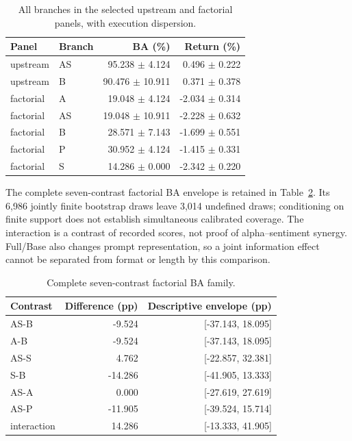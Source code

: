 \begin{table}[htbp]\centering\small{}\setlength{\tabcolsep}{4pt}
\caption[Selected upstream and factorial panels]{All branches in the selected upstream and factorial panels, with execution dispersion.}\label{tab:smallpanels}
\begin{tabular}{@{}l l rr@{}}\toprule
Panel & Branch & BA (\%) & Return (\%)\\\midrule
upstream & AS & 95.238 \ensuremath{\pm} 4.124 & 0.496 \ensuremath{\pm} 0.222\\
upstream & B & 90.476 \ensuremath{\pm} 10.911 & 0.371 \ensuremath{\pm} 0.378\\
factorial & A & 19.048 \ensuremath{\pm} 4.124 & -2.034 \ensuremath{\pm} 0.314\\
factorial & AS & 19.048 \ensuremath{\pm} 10.911 & -2.228 \ensuremath{\pm} 0.632\\
factorial & B & 28.571 \ensuremath{\pm} 7.143 & -1.699 \ensuremath{\pm} 0.551\\
factorial & P & 30.952 \ensuremath{\pm} 4.124 & -1.415 \ensuremath{\pm} 0.331\\
factorial & S & 14.286 \ensuremath{\pm} 0.000 & -2.342 \ensuremath{\pm} 0.220\\
\bottomrule\end{tabular}\end{table}

The complete seven-contrast factorial BA envelope is retained in
Table~\ref{tab:factorial}. Its 6,986 jointly finite bootstrap draws leave
3,014 undefined draws; conditioning on finite support does not establish
simultaneous calibrated coverage. The interaction is a contrast of
recorded scores, not proof of alpha--sentiment synergy. Full/Base also
changes prompt representation, so a joint information effect cannot be
separated from format or length by this comparison.

\begin{table}[htbp]\centering\small{}\setlength{\tabcolsep}{4pt}
\caption[Complete factorial BA family]{Complete seven-contrast factorial BA family.}\label{tab:factorial}
\begin{tabular}{@{}l rr@{}}\toprule
Contrast & Difference (pp) & Descriptive envelope (pp)\\\midrule
AS-B & -9.524 & {[}-37.143, 18.095{]}\\
A-B & -9.524 & {[}-37.143, 18.095{]}\\
AS-S & 4.762 & {[}-22.857, 32.381{]}\\
S-B & -14.286 & {[}-41.905, 13.333{]}\\
AS-A & 0.000 & {[}-27.619, 27.619{]}\\
AS-P & -11.905 & {[}-39.524, 15.714{]}\\
interaction & 14.286 & {[}-13.333, 41.905{]}\\
\bottomrule\end{tabular}\end{table}

